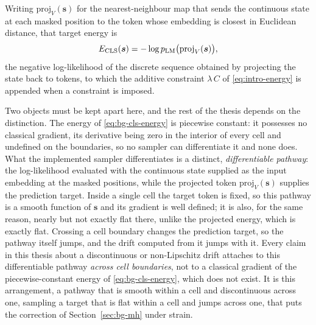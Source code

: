 Writing $\mathrm{proj}_V(\bm{s})$ for the nearest-neighbour map that sends the continuous state at each masked position to the token whose embedding is closest in Euclidean distance, that target energy is
\begin{equation}
    E_{\text{CLS}}(\bm{s}) = -\log p_{\text{LM}}\bigl(\mathrm{proj}_V(\bm{s})\bigr),
    \label{eq:bg-cls-energy}
\end{equation}
the negative log-likelihood of the discrete sequence obtained by projecting the state back to tokens, to which the additive constraint $\lambda\, C$ of \eqref{eq:intro-energy} is appended when a constraint is imposed.

Two objects must be kept apart here, and the rest of the thesis depends on the distinction. The energy of \eqref{eq:bg-cls-energy} is piecewise constant: it possesses no classical gradient, its derivative being zero in the interior of every cell and undefined on the boundaries, so no sampler can differentiate it and none does. What the implemented sampler differentiates is a distinct, \emph{differentiable pathway}: the log-likelihood evaluated with the continuous state supplied as the input embedding at the masked positions, while the projected token $\mathrm{proj}_V(\bm{s})$ supplies the prediction target.
Inside a single cell the target token is fixed, so this pathway is a smooth function of $\bm{s}$ and its gradient is well defined; it is also, for the same reason, nearly but not exactly flat there, unlike the projected energy, which is exactly flat. Crossing a cell boundary changes the prediction target, so the pathway itself jumps, and the drift computed from it jumps with it. Every claim in this thesis about a discontinuous or non-Lipschitz drift attaches to this differentiable pathway \emph{across cell boundaries}, not to a classical gradient of the piecewise-constant energy of \eqref{eq:bg-cls-energy}, which does not exist. It is this arrangement, a pathway that is smooth within a cell and discontinuous across one, sampling a target that is flat within a cell and jumps across one, that puts the correction of Section~\ref{sec:bg-mh} under strain.
